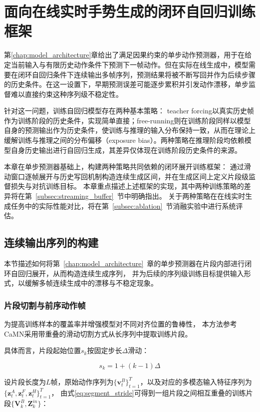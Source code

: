 \chapter{面向在线实时手势生成的闭环自回归训练框架}
\label{chap:training_strategy}

第\ref{chap:model_architecture}章给出了满足因果约束的单步动作预测器，用于在给定当前输入与有限历史动作条件下预测下一帧动作。但在实际在线生成中，模型需要在闭环自回归条件下连续输出多帧序列，预测结果将被不断写回并作为后续步骤的历史条件。在这一设置下，早期预测误差可能逐步累积并引发动作漂移，单步监督难以直接约束这种序列级不稳定性。

针对这一问题，训练自回归模型存在两种基本策略：
teacher forcing以真实历史帧作为训练阶段的历史条件，实现简单直接；free-running则在训练阶段同样以模型自身的预测输出作为历史条件，使训练与推理的输入分布保持一致，从而在理论上缓解训练与推理之间的分布偏移（exposure bias）。两种策略在推理阶段均依赖模型自身历史输出进行自回归生成，其差异仅体现在训练阶段历史条件的来源。

本章在单步预测器基础上，构建两种策略共同依赖的闭环展开训练框架：
通过滑动窗口逐帧展开与历史写回机制构造连续生成区间，并在生成区间上定义片段级监督损失与对抗训练目标。
本章重点描述上述框架的实现，其中两种训练策略的差异将在第~\ref{subsec:streaming_buffer}~节中明确指出。
关于两种策略在在线实时生成任务中的实际性能对比，将在第~\ref{subsec:ablation}~节消融实验中进行系统评估。

\section{连续输出序列的构建}

本节描述如何将第~\ref{chap:model_architecture}~章的单步预测器在片段内部进行闭环自回归展开，从而构造连续生成序列，
并为后续的序列级训练目标提供输入形式，以缓解多帧连续生成中的漂移与不稳定现象。

\subsection{片段切割与前序动作帧}
为提高训练样本的覆盖率并增强模型对不同对齐位置的鲁棒性，
本方法参考CaMN\cite{beatcamn}采用带重叠的滑动切割方式从长序列中提取训练片段。

具体而言，片段起始位置$s_k$按固定步长$\Delta$滑动：

\begin{equation}
s_k = 1 + (k-1)\Delta
\label{eq:segment_stride}
\end{equation}

设片段长度为$L$帧，原始动作序列为$\{\bm{v}_t^B\}_{t=1}^{T}$，以及对应的多模态输入特征序列为$\{\bm{z}_t^A, \bm{z}_t^F, \bm{z}_t^H\}_{t=1}^{T}$，
由式\eqref{eq:segment_stride}可得到一组片段之间相互重叠的训练片段$\{\bm{V}_k^B, \bm{Z}^{in}_k\}$：

